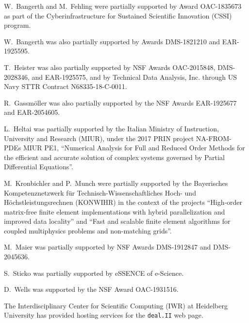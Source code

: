 \documentclass{ansarticle-preprint}
\newcommand{\specialword}[1]{\texttt{#1}}
\newcommand{\dealii}{{\specialword{deal.II}}\xspace}
\begin{document}
W.~Bangerth and M.~Fehling were partially supported by Award OAC-1835673
as part of the Cyberinfrastructure for Sustained Scientific Innovation (CSSI)
program.

W.~Bangerth was also partially supported by Awards DMS-1821210 and EAR-1925595.

T.~Heister was also partially supported by NSF
Awards OAC-2015848, DMS-2028346, and
EAR-1925575, and by Technical Data Analysis, Inc. through US Navy STTR
Contract N68335-18-C-0011.

R.~Gassm{\"o}ller was also partially supported by the NSF Awards
EAR-1925677 and EAR-2054605.

L.~Heltai was partially supported by the Italian Ministry of Instruction,
University and Research (MIUR), under the 2017 PRIN project NA-FROM-PDEs MIUR
PE1, ``Numerical Analysis for Full and Reduced Order Methods for the efficient
and accurate solution of complex systems governed by Partial Differential
Equations''.

M.~Kronbichler and P.~Munch were partially supported by the
Bayerisches Kompetenznetzwerk
f\"ur Technisch-Wissen\-schaft\-li\-ches Hoch- und H\"ochstleistungsrechnen
(KONWIHR) in the context of the projects
``High-order matrix-free finite element implementations with
hybrid parallelization and improved data locality'' and ``Fast and scalable finite element algorithms for coupled multiphysics problems and non-matching grids''.

M.~Maier was partially supported by NSF Awards DMS-1912847 and DMS-2045636.

S.~Sticko was partially supported by eSSENCE of e-Science.

D.~Wells was supported by the NSF Award OAC-1931516.

The Interdisciplinary Center for Scientific Computing (IWR) at Heidelberg
University has provided hosting services for the \dealii web page.

{}

\end{document}
